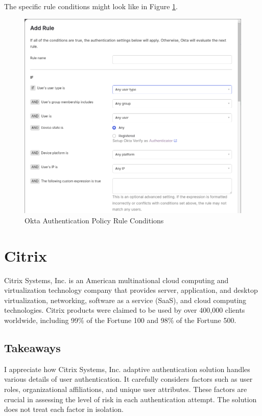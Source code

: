 The specific rule conditions might look like in Figure \ref{fig:okta-auth-policy-rule-condition}.

\begin{figure}[htbp]
  \centering
  \includegraphics[width=1\textwidth]{img/okta-add-rule.png}
  \caption{Okta Authentication Policy Rule Conditions}
  \label{fig:okta-auth-policy-rule-condition}
\end{figure}

\newpage
\section{Citrix}

Citrix Systems, Inc. is an American multinational cloud computing and virtualization technology company that provides server, application, and desktop virtualization, networking, software as a service (SaaS), and cloud computing technologies.
Citrix products were claimed to be used by over 400,000 clients worldwide, including 99\% of the Fortune 100 and 98\% of the Fortune 500.

\subsection*{Takeaways}
I appreciate how Citrix Systems, Inc. adaptive authentication solution handles various details of user authentication.
It carefully considers factors such as user roles, organizational affiliations, and unique user attributes.
These factors are crucial in assessing the level of risk in each authentication attempt.
The solution does not treat each factor in isolation.\cite{existing-citrix-wiki} \cite{existing-citrix-blog}


